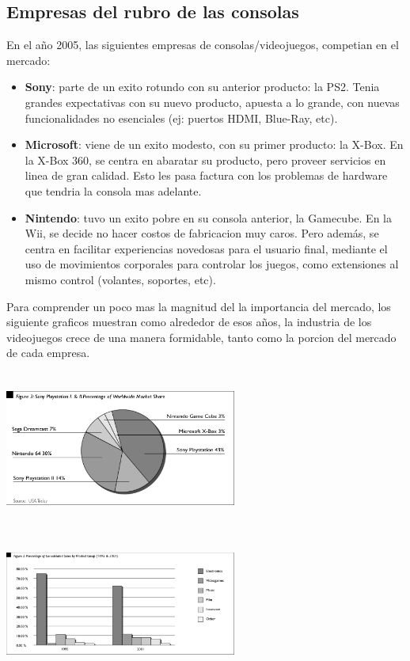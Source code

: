 \documentclass[11pt,compsoc]{IEEEtran}
\begin{document}
	\subsection{Empresas del rubro de las consolas}
	\noindent 
	En el año 2005, las siguientes empresas de consolas/videojuegos, competian en el mercado: 
	\begin{itemize}
		\item{{\bf{Sony}}: parte de un exito rotundo con su anterior producto: la PS2. Tenia grandes expectativas con su nuevo producto, apuesta a lo grande, con nuevas funcionalidades no esenciales (ej: puertos HDMI, Blue-Ray, etc).}
		
		\item{{\bf{Microsoft}}: viene de un exito modesto, con su primer producto: la X-Box. En la X-Box 360, se centra en abaratar su producto, pero proveer servicios en linea de gran calidad. Esto les pasa factura con los problemas de hardware que tendria la consola mas adelante.}
		
		\item{{\bf{Nintendo}}: tuvo un exito pobre en su consola anterior, la Gamecube. En la Wii, se decide no hacer costos de fabricacion muy caros. Pero además, se centra en facilitar experiencias novedosas para el usuario final, mediante el uso de movimientos corporales para controlar los juegos, como extensiones al mismo control (volantes, soportes, etc).}
	\end{itemize}
	Para comprender un poco mas la magnitud del la importancia del mercado, los siguiente graficos muestran como alrededor de esos años, la industria de los videojuegos crece de una manera formidable, tanto como la porcion del mercado de cada empresa.
	
	\begin{center}
		{\includegraphics[width=3in,height=2in,clip,keepaspectratio]{imgs/marketshare.png}}\newline\newline
		{\includegraphics[width=3in,height=2in,clip,keepaspectratio]{imgs/gamingshare.png}}
	\end{center}
	
\end{document}
